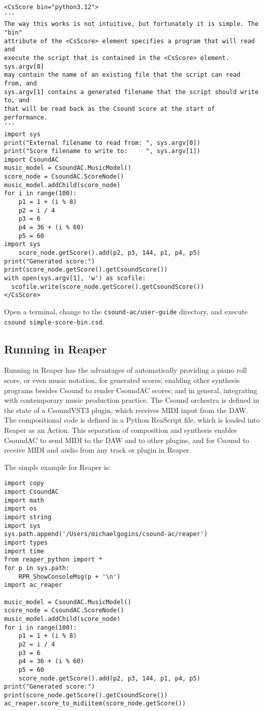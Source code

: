 \documentclass[letterpaper,10pt,DIV=12]{scrartcl}
\begin{document}
\begin{lstlisting}[basicstyle=\small\ttfamily]
<CsScore bin="python3.12">
'''
The way this works is not intuitive, but fortunately it is simple. The "bin" 
attribute of the <CsScore> element specifies a program that will read and 
execute the script that is contained in the <CsScore> element. sys.argv[0] 
may contain the name of an existing file that the script can read from, and 
sys.argv[1] contains a generated filename that the script should write to, and 
that will be read back as the Csound score at the start of performance.
'''
import sys
print("External filename to read from: ", sys.argv[0])
print("Score filename to write to:     ", sys.argv[1])
import CsoundAC
music_model = CsoundAC.MusicModel()
score_node = CsoundAC.ScoreNode()
music_model.addChild(score_node)
for i in range(100):
    p1 = 1 + (i % 8)
    p2 = i / 4
    p3 = 6
    p4 = 36 + (i % 60)
    p5 = 60
import sys
    score_node.getScore().add(p2, p3, 144, p1, p4, p5)
print("Generated score:")
print(score_node.getScore().getCsoundScore())
with open(sys.argv[1], 'w') as scofile:
  scofile.write(score_node.getScore().getCsoundScore())
</CsScore>
\end{lstlisting}

Open a terminal, change to the \lstinline|csound-ac/user-guide| directory, and execute \lstinline|csound simple-score-bin.csd|.

\subsection{Running in Reaper}

Running in Reaper has the advantages of automatically providing a piano roll score, or even music notation, for generated scores; enabling other synthesis programs besides Csound to render CsoundAC scores; and in general, integrating with contemporary music production practice. The Csound orchestra is defined in the state of a CsoundVST3 plugin, which receives MIDI input from the DAW. The compositional code is defined in a Python ReaScript file, which is loaded into Reaper as an Action. This separation of composition and synthesis enables CsoundAC to send MIDI to the DAW and to other plugins, and for Csound to receive MIDI and audio from any track or plugin in Reaper.

The simple example for Reaper is:

\begin{lstlisting}[basicstyle=\small\ttfamily]
import copy
import CsoundAC
import math
import os
import string
import sys
sys.path.append('/Users/michaelgogins/csound-ac/reaper')
import types
import time
from reaper_python import *
for p in sys.path:
    RPR_ShowConsoleMsg(p + '\n')
import ac_reaper

music_model = CsoundAC.MusicModel()
score_node = CsoundAC.ScoreNode()
music_model.addChild(score_node)
for i in range(100):
    p1 = 1 + (i % 8)
    p2 = i / 4
    p3 = 6
    p4 = 36 + (i % 60)
    p5 = 60
    score_node.getScore().add(p2, p3, 144, p1, p4, p5)
print("Generated score:")
print(score_node.getScore().getCsoundScore())
ac_reaper.score_to_midiitem(score_node.getScore())
\end{lstlisting}
\end{document}
